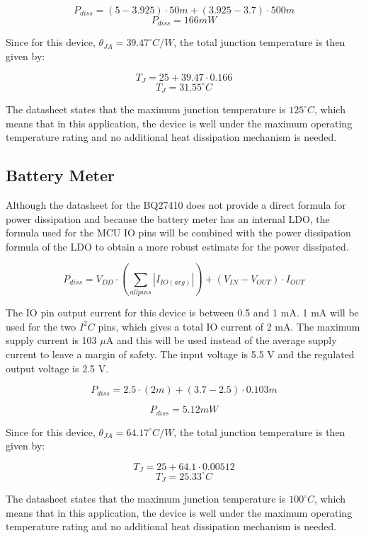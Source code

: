 \documentclass[12pt,letterpaper]{article}
\begin{document}
\[P_{diss} = \left(5 - 3.925\right)\cdot 50m + \left(3.925 - 3.7\right)\cdot 500m\]
\[\boxed{P_{diss} = 166 mW}\]

Since for this device, $\theta_{JA} = 39.47^\circ C/W$, the total junction temperature is then given by:

\[T_J = 25 + 39.47 \cdot 0.166 \]
\[\boxed{T_J = 31.55 ^\circ C}\]

The datasheet states that the maximum junction temperature is $125^\circ C$, which means that in this application, the device is well under the maximum operating temperature rating and no additional heat dissipation mechanism is needed.


\subsection{Battery Meter}
Although the datasheet for the BQ27410 does not provide a direct formula for power dissipation and because the battery meter has an internal LDO, the formula used for the MCU IO pins will be combined with the power dissipation formula of the LDO to obtain a more robust estimate for the power dissipated.  

\[P_{diss} = V_{DD} \cdot \left(\sum_{allpins} |I_{IO(avg)}| \right) + \left(V_{IN} - V_{OUT}\right)\cdot I_{OUT}\]

The IO pin output current for this device is between 0.5 and 1 mA.  1 mA will be used for the two $I^2C$ pins, which gives a total IO current of 2 mA.  The maximum supply current is 103 $\mu$A and this will be used instead of the average supply current to leave a margin of safety.  The input voltage is 5.5 V and the regulated output voltage is 2.5 V.

\[P_{diss} = 2.5 \cdot \left(2m \right) + \left(3.7 - 2.5\right)\cdot 0.103m\]

\[\boxed{P_{diss} = 5.12 mW}\]

Since for this device, $\theta_{JA} = 64.17^\circ C/W$, the total junction temperature is then given by:

\[T_J = 25 + 64.1 \cdot 0.00512 \]
\[\boxed{T_J = 25.33 ^\circ C}\]

The datasheet states that the maximum junction temperature is $100^\circ C$, which means that in this application, the device is well under the maximum operating temperature rating and no additional heat dissipation mechanism is needed.



\end{document}
